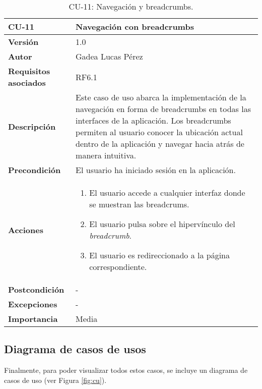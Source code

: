 \begin{table}[p]
\centering
\begin{tabularx}{\linewidth}{ p{} p{} }
\toprule
\textbf{CU-11} & \textbf{Navegación con breadcrumbs}\\
\toprule
\textbf{Versión} & 1.0 \\
\textbf{Autor} & Gadea Lucas Pérez \\
\textbf{Requisitos asociados} & RF6.1 \\
\textbf{Descripción} & Este caso de uso abarca la implementación de la navegación en forma de breadcrumbs en todas las interfaces de la aplicación. Los breadcrumbs permiten al usuario conocer la ubicación actual dentro de la aplicación y navegar hacia atrás de manera intuitiva.\\
\textbf{Precondición} & El usuario ha iniciado sesión en la aplicación.\\
\textbf{Acciones} &
\begin{enumerate}
\def\labelenumi{\arabic{enumi}.}
\tightlist
\item El usuario accede a cualquier interfaz donde se muestran las breadcrums.
\item El usuario pulsa sobre el hipervínculo del \textit{breadcrumb}.
\item El usuario es redireccionado a la página correspondiente.
\end{enumerate}\\ 
\textbf{Postcondición} & - \\
\textbf{Excepciones} & - \\
\textbf{Importancia} & Media \\
\bottomrule
\end{tabularx}
\caption{CU-11: Navegación y breadcrumbs.}
\label{tab:cu11}
\end{table}



\subsection{Diagrama de casos de usos}

Finalmente, para poder visualizar todos estos casos, se incluye un diagrama de casos de uso (ver Figura \ref{fig:cu}).

